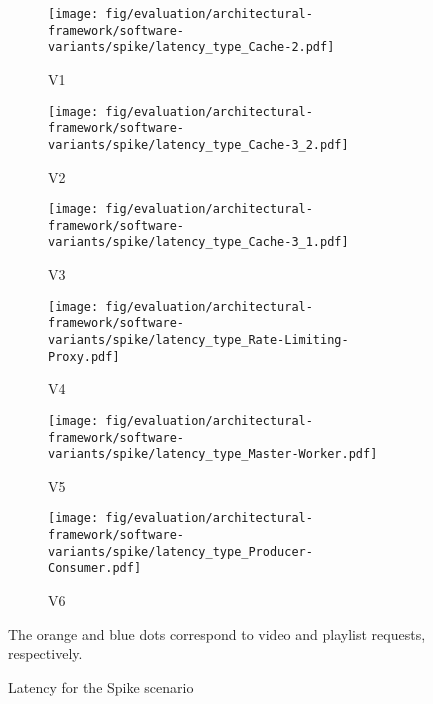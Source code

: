 \begin{figure}[p]
	\centering
	\begin{subfigure}[b]{0.48\textwidth}
		\texttt{[image: fig/evaluation/architectural-framework/software-variants/spike/latency\_type\_Cache-2.pdf]}
		\caption{V1}
		\label{fig:evaluation--im-architecture-spike-latency-cache-1}
	\end{subfigure}
	\begin{subfigure}[b]{0.48\textwidth}
		\texttt{[image: fig/evaluation/architectural-framework/software-variants/spike/latency\_type\_Cache-3\_2.pdf]}
		\caption{V2}
		\label{fig:evaluation--im-architecture-spike-latency-cache-2}
	\end{subfigure}
	\begin{subfigure}[b]{0.48\textwidth}
		\texttt{[image: fig/evaluation/architectural-framework/software-variants/spike/latency\_type\_Cache-3\_1.pdf]}
		\caption{V3}
		\label{fig:evaluation--im-architecture-spike-latency-cache}
	\end{subfigure}
	\begin{subfigure}[b]{0.48\textwidth}
		\texttt{[image: fig/evaluation/architectural-framework/software-variants/spike/latency\_type\_Rate-Limiting-Proxy.pdf]}
		\caption{V4}
		\label{fig:evaluation--im-architecture-spike-latency-rate-limiting-proxy}
	\end{subfigure}
	\begin{subfigure}[b]{0.48\textwidth}
		\texttt{[image: fig/evaluation/architectural-framework/software-variants/spike/latency\_type\_Master-Worker.pdf]}
		\caption{V5}
		\label{fig:evaluation--im-architecture-spike-latency-master-worker}
	\end{subfigure}
	\begin{subfigure}[b]{0.48\textwidth}
		\texttt{[image: fig/evaluation/architectural-framework/software-variants/spike/latency\_type\_Producer-Consumer.pdf]}
		\caption{V6}
		\label{fig:evaluation--im-architecture-spike-latency-producer-consumer}
	\end{subfigure}
	\caption{Latency for the Spike scenario}
	\label{fig:evaluation--im-architecture-spike-latency-by-request-type}
	The orange and blue dots correspond to video and playlist requests, respectively.
\end{figure}

